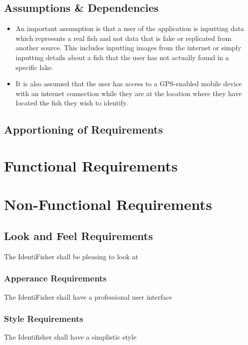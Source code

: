 \documentclass{article}
\begin{document}
\subsection{Assumptions \& Dependencies}
\begin{itemize}
	\item
	An important assumption is that a user of the application is inputting data which represents a real fish and not data that is fake or replicated from another source. This includes inputting images from the internet or simply inputting details about a fish that the user has not actually found in a specific lake. 
	
	\item
	It is also assumed that the user has access to a GPS-enabled mobile device with an internet connection while they are at the location where they have located the fish they wish to identify.
\end{itemize}

\subsection{Apportioning of Requirements}

\iffalse
Have not determined yet whether there are requirements that we be delayed until the future.	
\fi

\section{Functional Requirements}

\section{Non-Functional Requirements}

\subsection{Look and Feel Requirements}
The IdentiFisher shall be pleasing to look at
\subsubsection{Apperance Requirements}
The IdentiFisher shall have a professional user interface
\subsubsection{Style Requirements}
The Identifisher shall have a simplistic style
\end{document}

